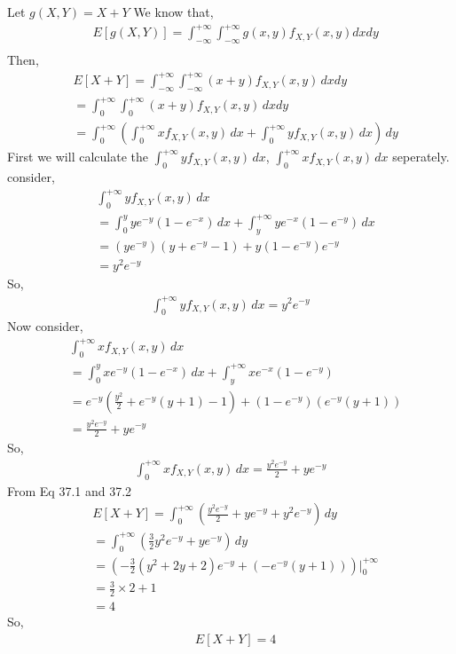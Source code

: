 Let $g(X,Y)=X+Y$
We know that,
\begin{align*}
    &E[g(X,Y)]=\int_{-\infty}^{+\infty}\int_{-\infty}^{+\infty}g(x,y)f_{X,Y}(x,y)dxdy\\
\end{align*}
Then,
\begin{align*}
    &E[X+Y]=\int_{-\infty}^{+\infty}\int_{-\infty}^{+\infty}(x+y)f_{X,Y}(x,y)\,dxdy\\
    &=\int_{0}^{+\infty}\int_{0}^{+\infty}(x+y)f_{X,Y}(x,y)\,dxdy\\
    &=\int_{0}^{+\infty}\left(\int_{0}^{+\infty}xf_{X,Y}(x,y)\,dx+\int_{0}^{+\infty}yf_{X,Y}(x,y)\,dx\right)\,dy
\end{align*}
First we will calculate the $\int_{0}^{+\infty}yf_{X,Y}(x,y)\,dx$,  $\int_{0}^{+\infty}xf_{X,Y}(x,y)\,dx$ seperately.\\
consider,
\begin{align*}
    &\int_{0}^{+\infty}yf_{X,Y}(x,y)\,dx\\
    &=\int_{0}^{y}ye^{-y}(1-e^{-x})\,dx+\int_{y}^{+\infty}ye^{-x}(1-e^{-y})\,dx\\
    &=(ye^{-y})(y+e^{-y}-1)+y(1-e^{-y})e^{-y}\\
    &=y^2e^{-y}
\end{align*}
So,
\begin{align}
    \tag{37.1}
    \int_{0}^{+\infty}yf_{X,Y}(x,y)\,dx=y^2e^{-y}
\end{align}
Now consider,
\begin{align*}
  &\int_{0}^{+\infty}xf_{X,Y}(x,y)\,dx\\
  &=\int_{0}^{y}xe^{-y}(1-e^{-x})\,dx+\int_{y}^{+\infty}xe^{-x}(1-e^{-y})\\
  &=e^{-y}\left(\frac{y^2}{2}+e^{-y}(y+1)-1\right)+(1-e^{-y})(e^{-y}(y+1))\\
  &=\frac{y^2e^{-y}}{2}+ye^{-y}
\end{align*}
So,
\begin{align}
    \tag{37.2}
    \int_{0}^{+\infty}xf_{X,Y}(x,y)\,dx=\frac{y^2e^{-y}}{2}+ye^{-y}
\end{align}
From Eq 37.1 and 37.2
\begin{align*}
    &E[X+Y]=\int_{0}^{+\infty}\left(\frac{y^2e^{-y}}{2}+ye^{-y}+y^2e^{-y}\right)\,dy\\
    &=\int_{0}^{+\infty}\left(\frac{3}{2}y^2e^{-y}+ye^{-y}\right)\,dy\\
    &=\left(-\frac{3}{2}(y^2+2y+2)e^{-y}+(-e^{-y}(y+1))\right)\Biggr|_{0}^{+\infty}\\
    &=\frac{3}{2}\times2+1\\
    &=4
\end{align*}
So,
\begin{align*}
  &E[X+Y]=4
\end{align*}